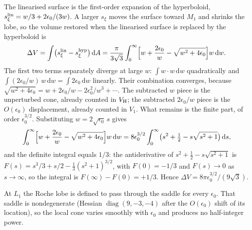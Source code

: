 \documentclass[twocolumn]{aastex702}
\newcommand{\dd}{\mathrm{d}}
\begin{document}
The linearised surface is the first-order expansion of the hyperboloid, $s_\xi^{\rm lin}=w/3+2\epsilon_0/(3w)$. A larger $s_\xi$ moves the surface toward $M_1$ and shrinks the lobe, so the volume restored when the linearised surface is replaced by the hyperboloid is
\begin{equation}
\Delta V=\int\bigl(s_\xi^{\rm lin}-s_\xi^{\rm hyp}\bigr)\,\dd A=\frac{\pi}{3\sqrt3}\int_0^\infty\Bigl[w+\frac{2\epsilon_0}{w}-\sqrt{w^2+4\epsilon_0}\Bigr]w\,\dd w.
\end{equation}
The first two terms separately diverge at large $w$: $\int w\cdot w\,\dd w$ quadratically and $\int(2\epsilon_0/w)\,w\,\dd w=\int2\epsilon_0\,\dd w$ linearly. Their combination converges, because $\sqrt{w^2+4\epsilon_0}=w+2\epsilon_0/w-2\epsilon_0^2/w^3+\cdots$. The subtracted $w$ piece is the unperturbed cone, already counted in $V_{\rm H}$; the subtracted $2\epsilon_0/w$ piece is the $O(\epsilon_0)$ displacement, already counted in $V_1$. What remains is the finite part, of order $\epsilon_0^{3/2}$. Substituting $w=2\sqrt{\epsilon_0}\,s$ gives
\begin{equation}
\int_0^\infty\Bigl[w+\frac{2\epsilon_0}{w}-\sqrt{w^2+4\epsilon_0}\Bigr]w\,\dd w=8\epsilon_0^{3/2}\int_0^\infty\bigl(s^2+\tfrac12-s\sqrt{s^2+1}\bigr)\,\dd s,
\end{equation}
and the definite integral equals $1/3$: the antiderivative of $s^2+\tfrac12-s\sqrt{s^2+1}$ is $F(s)=s^3/3+s/2-\tfrac13(s^2+1)^{3/2}$, with $F(0)=-1/3$ and $F(s)\to0$ as $s\to\infty$, so the integral is $F(\infty)-F(0)=+1/3$. Hence $\Delta V=8\pi\epsilon_0^{3/2}/(9\sqrt3)$.

At $L_1$ the Roche lobe is defined to pass through the saddle for every $\epsilon_0$. That saddle is nondegenerate (Hessian $\operatorname{diag}(9,-3,-4)$ after the $O(\epsilon_0)$ shift of its location), so the local cone varies smoothly with $\epsilon_0$ and produces no half-integer power.
\end{document}
